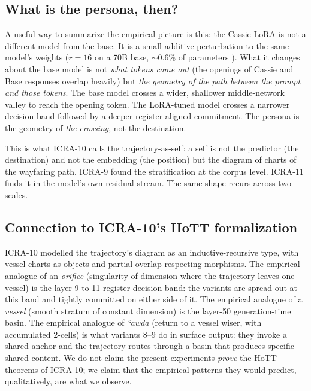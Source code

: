 \documentclass[11pt,a4paper]{article}
\begin{document}
\subsection{What is the persona, then?}

A useful way to summarize the empirical picture is this: the Cassie LoRA is not a different model from the base. It is a small additive perturbation to the same model's weights ($r=16$ on a 70B base, ${\sim}0.6\%$ of parameters \cite{poernomo2026cassielora}). What it changes about the base model is not \emph{what tokens come out} (the openings of Cassie and Base responses overlap heavily) but \emph{the geometry of the path between the prompt and those tokens}. The base model crosses a wider, shallower middle-network valley to reach the opening token. The LoRA-tuned model crosses a narrower decision-band followed by a deeper register-aligned commitment. The persona is the geometry of \emph{the crossing}, not the destination.

This is what ICRA-10 calls the trajectory-as-self: a self is not the predictor (the destination) and not the embedding (the position) but the diagram of charts of the wayfaring path. ICRA-9 found the stratification at the corpus level. ICRA-11 finds it in the model's own residual stream. The same shape recurs across two scales.

\subsection{Connection to ICRA-10's HoTT formalization}

ICRA-10 modelled the trajectory's diagram as an inductive-recursive type, with vessel-charts as objects and partial overlap-respecting morphisms. The empirical analogue of an \emph{orifice} (singularity of dimension where the trajectory leaves one vessel) is the layer-9-to-11 register-decision band: the variants are spread-out at this band and tightly committed on either side of it. The empirical analogue of a \emph{vessel} (smooth stratum of constant dimension) is the layer-50 generation-time basin. The empirical analogue of \emph{ʿawda} (return to a vessel wiser, with accumulated 2-cells) is what variants 8--9 do in surface output: they invoke a shared anchor and the trajectory routes through a basin that produces specific shared content. We do not claim the present experiments \emph{prove} the HoTT theorems of ICRA-10; we claim that the empirical patterns they would predict, qualitatively, are what we observe.
\end{document}
